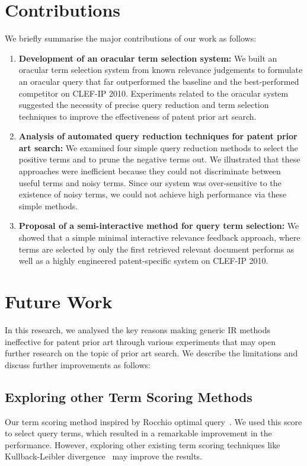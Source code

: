 \section{Contributions}
\label{sec:contributions}
We briefly summarise the major contributions of our work as follows:
\begin{enumerate}
\item \textbf{Development of an oracular term selection system: }We built an oracular term selection system from known relevance judgements to formulate an oracular query that far outperformed the baseline and the best-performed competitor on CLEF-IP 2010. 
Experiments related to the oracular system suggested the necessity of precise query
reduction and term selection techniques to improve the effectiveness of patent
prior art search.
\item \textbf{Analysis of automated query reduction techniques for patent prior art search: } We examined four simple query reduction methods to select the positive terms and to prune the negative terms out. We illustrated that these approaches were inefficient because they could not discriminate between useful terms and noisy terms. Since our system was over-sensitive to the existence of noisy terms, we could not achieve high performance via these simple methods. 
\item \textbf{Proposal of a semi-interactive method for query term selection: }We showed that a simple minimal interactive relevance feedback approach, where terms are selected by only the first retrieved relevant document performs as well as a highly engineered patent-specific system on CLEF-IP 2010. 
\end{enumerate}

\section{Future Work}
\label{sec:future}
In this research, we analysed the key reasons making generic IR methods ineffective for patent prior art through various experiments that may open further research on the topic of prior art search. We describe the limitations and discuss further improvements as follows: 
\subsection{Exploring other Term Scoring Methods}
\label{subsec:ExploringTermScoringMethods}
Our term scoring method inspired by Rocchio optimal query~\citep{manning2008introduction}. We used this score to select query terms, which resulted in a remarkable improvement in the performance. However, exploring other existing term scoring techniques like Kullback-Leibler divergence~\citep{Baeza-Yates2011} may improve the results.
